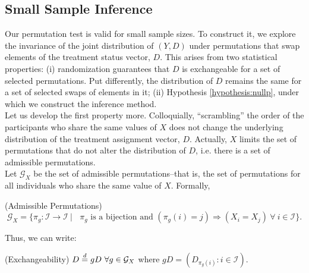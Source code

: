 \subsection*{Small Sample Inference} \label{section:smallsample}
Our permutation test is valid for small sample sizes. To construct it, we explore the invariance of the joint distribution of $(Y,D)$ under permutations that swap elements of the treatment status vector, $D$. This arises from two statistical properties: (i) randomization guarantees that $D$ is exchangeable for a set of selected permutations. Put differently, the distribution of $D$ remains the same for a set of selected swaps of elements in it; (ii) Hypothesis \ref{hypothesis:nullp}, under which we construct the inference method.\\
\indent Let us develop the first property more. Colloquially, ``scrambling'' the order of the participants who share the same values of $X$ does not change the underlying distribution of the treatment assignment vector, $D$. Actually, $X$ limits the set of permutations that do not alter the distribution of $D$, i.e. there is a set of admissible permutations. \\
\indent Let $\mathcal{G}_{X}$ be the set of admissible permutations--that is, the set of permutations for all individuals who share the same value of $X$. Formally,
\begin{definition} (Admissible Permutations) \label{definition:admissible}
\begin{equation*} \label{eq:Pi1}
    \mathcal{G}_X =\{ \pi_g :\mathcal{I} \rightarrow\mathcal{I} \ | \ \text{ $\pi_g$ is a bijection and }
        (\pi_g(i) =j) \Rightarrow (X_i = X_j)\: \forall \: i \in \mathcal{I}\}.
\end{equation*}
\end{definition}
\noindent Thus, we can write:
\begin{property} (Exchangeability) \label{property:exch}
$D \equald gD \ \forall g \in \mathcal{G}_X$ where $gD = (D_{\pi_g(i)} : i \in \mathcal{I})$.
\end{property}


